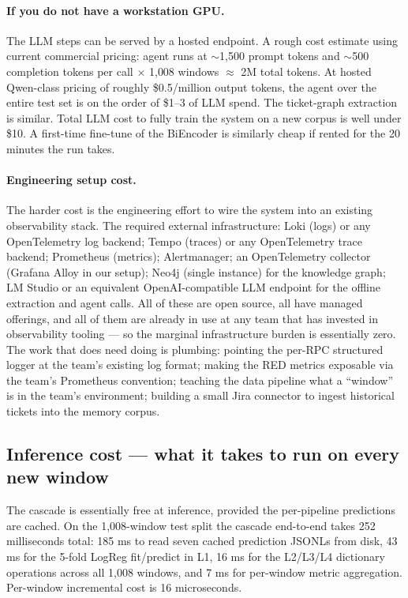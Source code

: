 \paragraph{If you do not have a workstation GPU.} The LLM steps can be served by a hosted endpoint. A rough cost estimate using current commercial pricing: agent runs at $\sim$1{,}500 prompt tokens and $\sim$500 completion tokens per call $\times$ 1{,}008 windows $\approx$ 2M total tokens. At hosted Qwen-class pricing of roughly \$0.5/million output tokens, the agent over the entire test set is on the order of \$1--3 of LLM spend. The ticket-graph extraction is similar. Total LLM cost to fully train the system on a new corpus is well under \$10. A first-time fine-tune of the BiEncoder is similarly cheap if rented for the 20 minutes the run takes.

\paragraph{Engineering setup cost.} The harder cost is the engineering effort to wire the system into an existing observability stack. The required external infrastructure: Loki (logs) or any OpenTelemetry log backend; Tempo (traces) or any OpenTelemetry trace backend; Prometheus (metrics); Alertmanager; an OpenTelemetry collector (Grafana Alloy in our setup); Neo4j (single instance) for the knowledge graph; LM Studio or an equivalent OpenAI-compatible LLM endpoint for the offline extraction and agent calls. All of these are open source, all have managed offerings, and all of them are already in use at any team that has invested in observability tooling --- so the marginal infrastructure burden is essentially zero. The work that does need doing is plumbing: pointing the per-RPC structured logger at the team's existing log format; making the RED metrics exposable via the team's Prometheus convention; teaching the data pipeline what a ``window'' is in the team's environment; building a small Jira connector to ingest historical tickets into the memory corpus.

\subsection{Inference cost --- what it takes to run on every new window}

The cascade is essentially free at inference, provided the per-pipeline predictions are cached. On the 1{,}008-window test split the cascade end-to-end takes 252 milliseconds total: 185 ms to read seven cached prediction JSONLs from disk, 43 ms for the 5-fold LogReg fit/predict in L1, 16 ms for the L2/L3/L4 dictionary operations across all 1{,}008 windows, and 7 ms for per-window metric aggregation. Per-window incremental cost is 16 microseconds.

